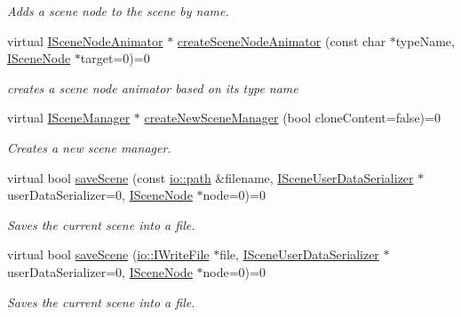 \begin{DoxyCompactItemize}
\begin{DoxyCompactList}\small\item\em Adds a scene node to the scene by name. \end{DoxyCompactList}\item 
virtual \hyperlink{classirr_1_1scene_1_1ISceneNodeAnimator}{I\+Scene\+Node\+Animator} $\ast$ \hyperlink{classirr_1_1scene_1_1ISceneManager_ac63c38a05b8e7d0a11ddb1752da36835}{create\+Scene\+Node\+Animator} (const char $\ast$type\+Name, \hyperlink{classirr_1_1scene_1_1ISceneNode}{I\+Scene\+Node} $\ast$target=0)=0
\begin{DoxyCompactList}\small\item\em creates a scene node animator based on its type name \end{DoxyCompactList}\item 
virtual \hyperlink{classirr_1_1scene_1_1ISceneManager}{I\+Scene\+Manager} $\ast$ \hyperlink{classirr_1_1scene_1_1ISceneManager_a94805dd4eca41ccef9607aefe669aed9}{create\+New\+Scene\+Manager} (bool clone\+Content=false)=0
\begin{DoxyCompactList}\small\item\em Creates a new scene manager. \end{DoxyCompactList}\item 
virtual bool \hyperlink{classirr_1_1scene_1_1ISceneManager_a6dd059e96ff4f7233b7ba1ed7e39c337}{save\+Scene} (const \hyperlink{namespaceirr_1_1io_a6468281622ce3a1c46b72e19f32dded5}{io\+::path} \&filename, \hyperlink{classirr_1_1scene_1_1ISceneUserDataSerializer}{I\+Scene\+User\+Data\+Serializer} $\ast$user\+Data\+Serializer=0, \hyperlink{classirr_1_1scene_1_1ISceneNode}{I\+Scene\+Node} $\ast$node=0)=0
\begin{DoxyCompactList}\small\item\em Saves the current scene into a file. \end{DoxyCompactList}\item 
virtual bool \hyperlink{classirr_1_1scene_1_1ISceneManager_a5de4b5131186f3bcd8b0213f68e4a9ce}{save\+Scene} (\hyperlink{classirr_1_1io_1_1IWriteFile}{io\+::\+I\+Write\+File} $\ast$file, \hyperlink{classirr_1_1scene_1_1ISceneUserDataSerializer}{I\+Scene\+User\+Data\+Serializer} $\ast$user\+Data\+Serializer=0, \hyperlink{classirr_1_1scene_1_1ISceneNode}{I\+Scene\+Node} $\ast$node=0)=0
\begin{DoxyCompactList}\small\item\em Saves the current scene into a file. \end{DoxyCompactList}\item 

\end{DoxyCompactItemize}
